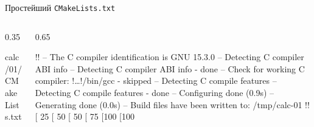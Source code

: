 \documentclass[compress, 8pt, aspectratio=169]{beamer}
\begin{document}
\begin{frame}[fragile]{Простейший \texttt{CMakeLists.txt}}

  \begin{columns}[T]

    \begin{column}{0.35\textwidth}

        {calc/01/CMakeLists.txt}

    \end{column}

    \begin{column}{0.65\textwidth}

      \begin{terminalwindow}
!!
-- The C compiler identification is GNU 15.3.0
-- Detecting C compiler ABI info
-- Detecting C compiler ABI info - done
-- Check for working C compiler: !\dots!/bin/gcc - skipped
-- Detecting C compile features
-- Detecting C compile features - done
-- Configuring done (0.9s)
-- Generating done (0.0s)
-- Build files have been written to: /tmp/calc-01
!!
[ 25%
[ 50%
[ 50%
[ 75%
[100%
[100%
      \end{terminalwindow}

    \end{column}

  \end{columns}

\end{frame}
\end{document}
